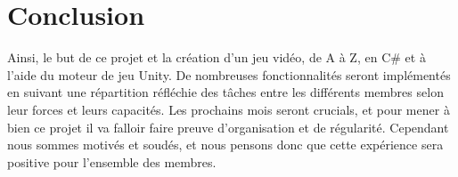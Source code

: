 \documentclass[french, 12pt]{article}
\begin{document}
\section{Conclusion}

Ainsi, le but de ce projet et la création d'un jeu vidéo, de A à Z, en C\# et à l'aide du moteur de jeu Unity. 
De nombreuses fonctionnalités seront implémentés en suivant une répartition réfléchie des tâches entre les différents 
membres selon leur forces et leurs capacités. Les prochains mois seront crucials, et pour mener à bien ce projet il va 
falloir faire preuve d'organisation et de régularité. Cependant nous sommes motivés et soudés, 
et nous pensons donc que cette expérience sera positive pour l'ensemble des membres.
% 
\end{document}
